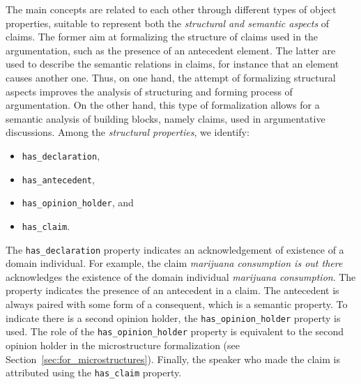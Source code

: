 The main concepts are related to each other through different types of object
properties, suitable to represent both the \emph{structural and semantic aspects} of
claims. The former aim at formalizing the structure of claims used in
the argumentation, such as the presence of an antecedent element. The latter
are used to describe the semantic relations in claims, for instance that
an element causes another one. Thus, on one hand, the attempt of 
formalizing structural aspects improves the analysis of structuring and
forming process of argumentation. On the other hand, this type of formalization
allows for a semantic analysis of building blocks, namely claims, used in 
argumentative discussions. Among the \emph{structural properties}, we identify:
\begin{itemize}
\item \texttt{has\_declaration}, 
\item \texttt{has\_antecedent},
\item \texttt{has\_opinion\_holder}, and
\item \texttt{has\_claim}. 
\end{itemize}
The \texttt{has\_declaration} property indicates an acknowledgement of
existence of a domain individual. For example, the claim 
\emph{marijuana consumption is out there} acknowledges
the existence of the domain individual \emph{marijuana consumption}.
The  property indicates the presence of an 
antecedent in a claim. The antecedent is always paired with some
form of a consequent, which is a semantic property. To indicate
there is a second opinion holder, the \texttt{has\_opinion\_holder}
property is used. The role of the \texttt{has\_opinion\_holder}
property is equivalent to the second opinion holder in the microstructure
formalization (see Section~\ref{sec:for_microstructures}). Finally, the speaker
who made the claim is attributed using the \texttt{has\_claim} property.

